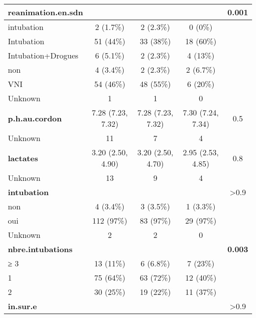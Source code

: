 \documentclass[
  10pt,
  a4paper,
]{scrartcl}
\begin{document}
\begin{table}
\begin{tabular}[t]{l|c|c|c|c}
\hline
\textbf{reanimation.en.sdn} &  &  &  & \textbf{0.001}\\
\hline
\hspace{1em}intubation & 2 (1.7\%) & 2 (2.3\%) & 0 (0\%) & \\
\hline
\hspace{1em}Intubation & 51 (44\%) & 33 (38\%) & 18 (60\%) & \\
\hline
\hspace{1em}Intubation+Drogues & 6 (5.1\%) & 2 (2.3\%) & 4 (13\%) & \\
\hline
\hspace{1em}non & 4 (3.4\%) & 2 (2.3\%) & 2 (6.7\%) & \\
\hline
\hspace{1em}VNI & 54 (46\%) & 48 (55\%) & 6 (20\%) & \\
\hline
\hspace{1em}Unknown & 1 & 1 & 0 & \\
\hline
\textbf{p.h.au.cordon} & 7.28 (7.23, 7.32) & 7.28 (7.23, 7.32) & 7.30 (7.24, 7.34) & 0.5\\
\hline
\hspace{1em}Unknown & 11 & 7 & 4 & \\
\hline
\textbf{lactates} & 3.20 (2.50, 4.90) & 3.20 (2.50, 4.70) & 2.95 (2.53, 4.85) & 0.8\\
\hline
\hspace{1em}Unknown & 13 & 9 & 4 & \\
\hline
\textbf{intubation} &  &  &  & >0.9\\
\hline
\hspace{1em}non & 4 (3.4\%) & 3 (3.5\%) & 1 (3.3\%) & \\
\hline
\hspace{1em}oui & 112 (97\%) & 83 (97\%) & 29 (97\%) & \\
\hline
\hspace{1em}Unknown & 2 & 2 & 0 \vphantom{3} & \\
\hline
\textbf{nbre.intubations} &  &  &  & \textbf{0.003}\\
\hline
\hspace{1em}≥ 3 & 13 (11\%) & 6 (6.8\%) & 7 (23\%) & \\
\hline
\hspace{1em}1 & 75 (64\%) & 63 (72\%) & 12 (40\%) & \\
\hline
\hspace{1em}2 & 30 (25\%) & 19 (22\%) & 11 (37\%) & \\
\hline
\textbf{in.sur.e} &  &  &  & >0.9\\

\end{tabular}
\end{table}
\end{document}
